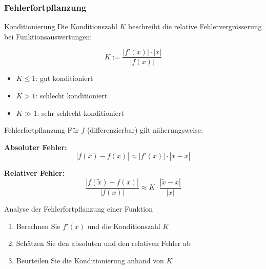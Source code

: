 \raggedcolumns

\subsubsection{Fehlerfortpflanzung}

\begin{concept}{Konditionierung}
    Die Konditionszahl $K$ beschreibt die relative Fehlervergrösserung bei Funktionsauswertungen:
    \vspace{1mm}\\
\begin{minipage}{0.3\textwidth}
    \vspace{-2mm}
    $$K := \frac{|f'(x)| \cdot |x|}{|f(x)|}$$
\end{minipage}
\hspace{2mm}
\begin{minipage}{0.6\textwidth}
\begin{itemize}
    \item $K \leq 1$: gut konditioniert
    \item $K > 1$: schlecht konditioniert
    \item $K \gg 1$: sehr schlecht konditioniert
\end{itemize}
\end{minipage}
\end{concept}


\begin{theorem}{Fehlerfortpflanzung}
Für $f$ (differenzierbar) gilt näherungsweise:
\vspace{1mm}\\
\begin{minipage}[t]{0.47\textwidth}
    \textbf{Absoluter Fehler:}  
    \vspace{-2mm}\\
    $$|f(\tilde{x})-f(x)| \approx |f'(x)| \cdot |\tilde{x}-x|$$
\end{minipage}
\hspace{3mm}
\begin{minipage}[t]{0.43\textwidth}
    \textbf{Relativer Fehler:}  
    \vspace{-2mm}\\
    $$\frac{|f(\tilde{x})-f(x)|}{|f(x)|} \approx K \cdot \frac{|\tilde{x}-x|}{|x|}$$
\end{minipage}
\end{theorem}

\begin{KR}{Analyse der Fehlerfortpflanzung einer Funktion}
\begin{enumerate}
    \item Berechnen Sie $f'(x)$ und die Konditionszahl $K$
    \item Schätzen Sie den absoluten und den relativen Fehler ab
    \item Beurteilen Sie die Konditionierung anhand von $K$
\end{enumerate}
\end{KR}

